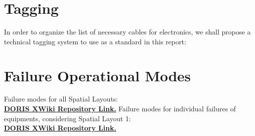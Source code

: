 \section{Tagging} \label{NORMAL_SCE}
In order to organize the list of necessary cables for electronics, we shall propose a technical tagging system to use as a standard in this report:




\section{Failure Operational Modes} \label{FAILURE_SCE}
Failure modes for all Spatial Layouts:\\ \textbf{\href{http://www.coep.ufrj.br:8080/xwiki/bin/download/DORIS/G2+Miscellaneous+Files/Cen\%C3\%A1rios\%20de\%20Falha\%20-\%20ingles.pdf}{DORIS XWiki Repository Link.}}
\newline
\newline
Failure modes for individual failures of equipments, considering Spatial Layout 1:\\
\textbf{\href{http://www.coep.ufrj.br:8080/xwiki/bin/download/DORIS/G2+Miscellaneous+Files/Tabela\%20Falhas.pdf}{DORIS XWiki Repository Link.}}
